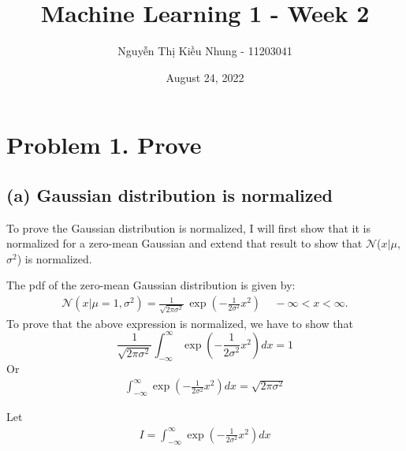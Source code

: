 \documentclass{article}
\title{Machine Learning 1 - Week 2 }
\author{Nguyễn Thị Kiều Nhung - 11203041}
\date{August 24, 2022}
\begin{document}
\maketitle

\section*{Problem 1. Prove}


\subsection*{(a)  Gaussian distribution is normalized }


To prove  the Gaussian distribution is normalized, I will first show that it is normalized for a zero-mean Gaussian and extend that result to show that $\mathcal{N}$($x$$\mid$$\mu$, $\sigma$$^{2}$) is normalized.		

The pdf of the zero-mean Gaussian distribution is given by:
\begin{align}	
\mathcal{N}(x|\mu = 1, \sigma^2)= \frac{1}{\sqrt{2\pi\sigma^2}}\, \exp\left(-\frac{1}{2\sigma^2}x^2\right)\,\,\,\,\,\,\,-\infty < x < \infty.			
\end{align}
To prove that the above expression is normalized, we have to show that \\
$$
\frac{1}{\sqrt{2\pi\sigma^2}}\int_{-\infty}^{\infty}\exp\left(-\frac{1}{2\sigma^2}x^2\right)dx = 1
$$
Or
\begin{align}
\int_{-\infty}^{\infty} \exp\left(-\frac{1}{2\sigma^2}x^2\right)dx = \sqrt{2\pi\sigma^2}
\end{align}

Let
\begin{align}
I = \int_{-\infty}^{\infty} \exp\left(-\frac{1}{2\sigma^2}x^2\right)dx
\end{align}
\end{document}
